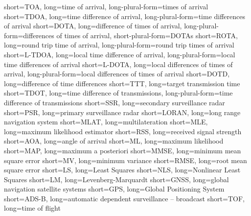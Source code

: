		{short={TOA},		        long={time of arrival}, long-plural-form={times of arrival}}
		{short={TDOA},		      long={time difference of arrival}, long-plural-form={time differences of arrival}}
		{short={DOTA},		      long={difference of times of arrival}, long-plural-form={differences of times of arrival}, short-plural-form={DOTAs}}
		{short={ROTA},		      long={round trip time of arrival}, long-plural-form={round trip times of arrival}}
	{short={L\hbox{-}TDOA},	long={local time difference of arrival}, long-plural-form={local time differences of arrival}}
	{short={L\hbox{-}DOTA},	long={local differences of times of arrival}, long-plural-form={local differences of times of arrival}}
		{short={DOTD},		      long={difference of time differences}}
		{short={TTT},		        long={target transmission time}}
		{short={TDOT},		      long={time difference of transmissions}, long-plural-form={time difference of transmissions}}
		{short={SSR},	    	    long={secondary surveillance radar}}
		{short={PSR},	    	    long={primary surveillance radar}}
	{short={LORAN},	    	  long={long range navigation system}}
		{short={MLAT},	    	  long={multilateration}}
		{short={MLE},	    	    long={maximum likelihood estimator}}
		{short={RSS},	    	    long={received signal strength}}
		{short={AOA},	    	    long={angle of arrival}}
		  {short={ML},	    	    long={maximum likelihood}}
	  {short={MAP},	    	    long={maximum a posteriori}}
		{short={MMSE},	    	  long={minimum mean square error}}
		{short={MV},	    	  long={minimum variance}}
		{short={RMSE},	    	  long={root mean square error}}
		  {short={LS},	    	    long={Least Squares}}
		  {short={NLS},	    	    long={Nonlinear Least Squares}}
		  {short={LM},	    	    long={Levenberg-Marquardt}}
		{short={GNSS},	    	  long={global navigation satellite systems}}
		{short={GPS},	    	    long={Global Positioning System}}
		{short={ADS-B},	    	  long={automatic dependent surveillance -- broadcast}}
		{short={TOF},	    	    long={time of flight}}
